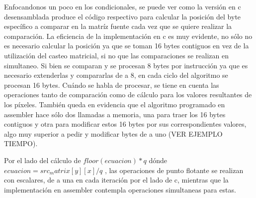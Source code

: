 Enfocandonos un poco en los condicionales, se puede ver como la versión en c desensamblada produce el código respectivo para calcular la posición del byte específico a comparar en la matríz fuente cada vez que se quiere realizar la comparación. La eficiencia de la implementación en c es muy evidente, no sólo no es necesario calcular la posición ya que se toman 16 bytes contiguos en vez de la utilización del casteo matricial, si no que las comparaciones se realizan en simultaneo. Si bien se comparan y se procesan 8 bytes por instrucción ya que es necesario extenderlas y compararlas de a 8, en cada ciclo del algoritmo se procesan 16 bytes. Cuándo se habla de procesar, se tiene en cuenta las operaciones tanto de comparación como de cálculo para los valores resultantes de los píxeles. También queda en evidencia que el algoritmo programado en assembler hace sólo dos llamadas a memoria, una para traer los 16 bytes contiguos y otra para modificar estos 16 bytes por sus correspondientes valores, algo muy superior a pedir y modificar bytes de a uno (VER EJEMPLO TIEMPO).

Por el lado del cálculo de $floor(ecuacion) * q$ dónde $ecuacion = src_matrix[y][x] / q$ , las operaciones de punto flotante se realizan con escalares, de a una en cada iteración por el lado de c, mientras que la implementación en assembler contempla operaciones simultaneas para estas.